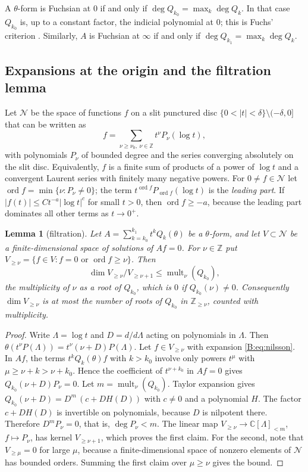 \documentclass[11pt,a4paper]{article}
\newtheorem{lemma}[theorem]{Lemma}
\theoremstyle{definition}
\theoremstyle{remark}
\newcommand{\C}{\mathbb C}
\newcommand{\Z}{\mathbb Z}
\DeclareMathOperator{\ord}{ord}
\numberwithin{equation}{section}
\begin{document}
A $\theta$-form is Fuchsian at $0$ if and only if $\deg Q_{k_0}=\max_k\deg Q_k$. In that case $Q_{k_0}$ is, up to a constant factor, the indicial polynomial at $0$; this is Fuchs' criterion \cite{Inc56}. Similarly, $A$ is Fuchsian at $\infty$ if and only if $\deg Q_{k_1}=\max_k\deg Q_k$.

\subsection{Expansions at the origin and the filtration lemma}
Let $\mathcal N$ be the space of functions $f$ on a slit punctured disc $\{0<|t|<\delta\}\setminus(-\delta,0]$ that can be written as
\begin{equation}\label{B:eq:nilsson}
f=\sum_{\nu\ge\nu_0,\ \nu\in\Z}t^\nu P_\nu(\log t),
\end{equation}
with polynomials $P_\nu$ of bounded degree and the series converging absolutely on the slit disc. Equivalently, $f$ is a finite sum of products of a power of $\log t$ and a convergent Laurent series with finitely many negative powers. For $0\ne f\in\mathcal N$ let $\ord f=\min\{\nu:P_\nu\ne0\}$; the term $t^{\ord f}P_{\ord f}(\log t)$ is the \emph{leading part}. If $|f(t)|\le Ct^{-a}|\log t|^c$ for small $t>0$, then $\ord f\ge -a$, because the leading part dominates all other terms as $t\to0^+$.

\begin{lemma}[filtration]\label{B:lem:filtration}
Let $A=\sum_{k=k_0}^{k_1}t^kQ_k(\theta)$ be a $\theta$-form, and let $V\subset\mathcal N$ be a finite-dimensional space of solutions of $Af=0$. For $\nu\in\Z$ put $V_{\ge\nu}=\{f\in V:f=0\text{ or }\ord f\ge\nu\}$. Then
\[
\dim V_{\ge\nu}/V_{\ge\nu+1}\le \operatorname{mult}_\nu(Q_{k_0}),
\]
the multiplicity of $\nu$ as a root of $Q_{k_0}$, which is $0$ if $Q_{k_0}(\nu)\ne0$. Consequently $\dim V_{\ge\nu}$ is at most the number of roots of $Q_{k_0}$ in $\Z_{\ge\nu}$, counted with multiplicity.
\end{lemma}

\begin{proof}
Write $\Lambda=\log t$ and $D=d/d\Lambda$ acting on polynomials in $\Lambda$. Then $\theta(t^\nu P(\Lambda))=t^\nu(\nu+D)P(\Lambda)$. Let $f\in V_{\ge\nu}$ with expansion \eqref{B:eq:nilsson}. In $Af$, the terms $t^kQ_k(\theta)f$ with $k>k_0$ involve only powers $t^{\mu}$ with $\mu\ge\nu+k>\nu+k_0$. Hence the coefficient of $t^{\nu+k_0}$ in $Af=0$ gives $Q_{k_0}(\nu+D)P_\nu=0$. Let $m=\operatorname{mult}_\nu(Q_{k_0})$. Taylor expansion gives $Q_{k_0}(\nu+D)=D^m\,(c+DH(D))$ with $c\ne0$ and a polynomial $H$. The factor $c+DH(D)$ is invertible on polynomials, because $D$ is nilpotent there. Therefore $D^mP_\nu=0$, that is, $\deg P_\nu<m$. The linear map $V_{\ge\nu}\to\C[\Lambda]_{<m}$, $f\mapsto P_\nu$, has kernel $V_{\ge\nu+1}$, which proves the first claim. For the second, note that $V_{\ge\mu}=0$ for large $\mu$, because a finite-dimensional space of nonzero elements of $\mathcal N$ has bounded orders. Summing the first claim over $\mu\ge\nu$ gives the bound.
\end{proof}
\end{document}
